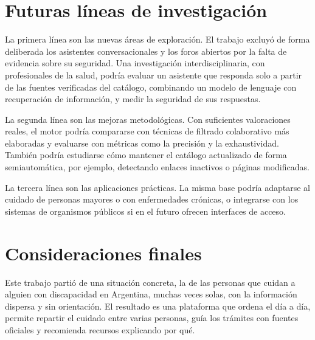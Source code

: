 \section{Futuras líneas de investigación}

La primera línea son las nuevas áreas de exploración. El trabajo excluyó de forma deliberada los asistentes conversacionales y los foros abiertos por la falta de evidencia sobre su seguridad. Una investigación interdisciplinaria, con profesionales de la salud, podría evaluar un asistente que responda solo a partir de las fuentes verificadas del catálogo, combinando un modelo de lenguaje con recuperación de información, y medir la seguridad de sus respuestas.

La segunda línea son las mejoras metodológicas. Con suficientes valoraciones reales, el motor podría compararse con técnicas de filtrado colaborativo más elaboradas y evaluarse con métricas como la precisión y la exhaustividad. También podría estudiarse cómo mantener el catálogo actualizado de forma semiautomática, por ejemplo, detectando enlaces inactivos o páginas modificadas.

La tercera línea son las aplicaciones prácticas. La misma base podría adaptarse al cuidado de personas mayores o con enfermedades crónicas, o integrarse con los sistemas de organismos públicos si en el futuro ofrecen interfaces de acceso.

\section{Consideraciones finales}

Este trabajo partió de una situación concreta, la de las personas que cuidan a alguien con discapacidad en Argentina, muchas veces solas, con la información dispersa y sin orientación. El resultado es una plataforma que ordena el día a día, permite repartir el cuidado entre varias personas, guía los trámites con fuentes oficiales y recomienda recursos explicando por qué.

